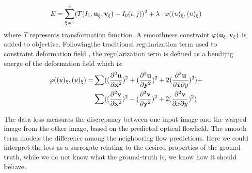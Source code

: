 \documentclass{iitthesis}
\begin{document}
\begin{equation}
E = \sum_{\xi = 1}^4(T(I_1, \bold{u}_{\xi}, \bold{v}_{\xi})-I_0(i, j))^2 + \lambda\cdot\varphi(\bold(u)_{\xi}, \bold(u)_{\xi})
\end{equation}
where $T$ represents transformation function. A smoothness constraint $\varphi(\bold{u}_{\xi}, \bold{v}_{\xi})$ is added to objective. Followingthe traditional regularization term used to constraint deformation field \cite{rohlfing2003volume}\cite{ashburner1999nonlinear}, the regularization term is defined as a bendijng energe of the deformation field which is:
\begin{align*}
\varphi(\bold(u)_{\xi}, \bold(u)_{\xi}) = & \sum ((\frac{\partial^2\bold{u}}{\partial \bold{x}^2})^2+(\frac{\partial^2\bold{u}}{\partial \bold{y}^2})^2+2(\frac{\partial^2\bold{u}}{\partial x \partial y})^2) + \\ 
& \sum ((\frac{\partial^2\bold{v}}{\partial \bold{x}^2})^2+(\frac{\partial^2\bold{v}}{\partial \bold{y}^2})^2+2(\frac{\partial^2\bold{v}}{\partial x \partial y})^2)
\end{align*}

The data loss measures the discrepancy between one input image and the warped image from the other image, based on the predicted optical flowfield. The smooth term models the difference among the neighboring flow predictions. Here we could interpret the loss as a surrogate relating to the desired properties of the ground-truth, while we do not know what the ground-truth is, we know how it should behave.
\end{document}
